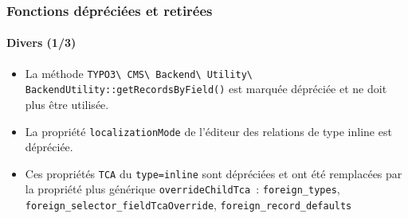 
\begin{frame}[fragile]
	\frametitle{Fonctions dépréciées et retirées}
	\framesubtitle{Divers (1/3)}

	\begin{itemize}

		\item La méthode
			\texttt{TYPO3\textbackslash
				CMS\textbackslash
				Backend\textbackslash
				Utility\textbackslash
				BackendUtility::\newline getRecordsByField()}
			est marquée dépréciée et ne doit plus être utilisée.

		\item La propriété \texttt{localizationMode} de l'éditeur des relations de type inline est dépréciée.

		\item Ces propriétés \texttt{TCA} du \texttt{type=inline} sont dépréciées et ont été remplacées par la
			propriété plus générique \texttt{overrideChildTca}~: \texttt{foreign\_types},
			\texttt{foreign\_selector\_fieldTcaOverride}, \texttt{foreign\_record\_defaults}

	\end{itemize}

\end{frame}



